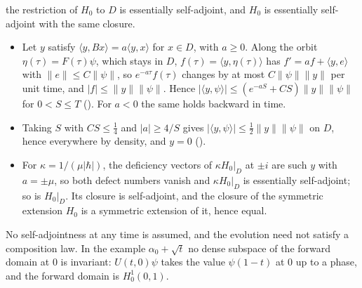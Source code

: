 \documentclass[11pt]{article}
\begin{document}
the restriction of $H_0$ to $D$ is essentially self-adjoint, and $H_0$ is essentially
self-adjoint with the same closure.
\begin{itemize}
\item Let $y$ satisfy $\langle y, B x\rangle = a\langle y, x\rangle$ for $x \in D$, with $a \ge 0$.
  Along the orbit $\eta(\tau) = F(\tau)\psi$, which stays in $D$, $f(\tau) = \langle y, \eta(\tau)\rangle$
  has $f' = af + \langle y, e\rangle$ with $\|e\| \le C\|\psi\|$, so $e^{-a\tau}f(\tau)$ changes by at
  most $C\|\psi\|\|y\|$ per unit time, and $|f| \le \|y\|\|\psi\|$. Hence
  $|\langle y, \psi\rangle| \le (e^{-aS} + CS)\|y\|\|\psi\|$ for $0 < S \le T$
  (). For $a < 0$ the same holds backward in time.
\item Taking $S$ with $CS \le \tfrac14$ and $|a| \ge 4/S$ gives
  $|\langle y,\psi\rangle| \le \tfrac12\|y\|\|\psi\|$ on $D$, hence everywhere by density, and
  $y = 0$ ().
\item For $\kappa = 1/(\mu|\hbar|)$, the deficiency vectors of $\kappa H_0|_D$ at $\pm i$ are such
  $y$ with $a = \pm\mu$, so both defect numbers vanish and $\kappa H_0|_D$ is essentially
  self-adjoint; so is $H_0|_D$. Its closure is self-adjoint, and the closure of the symmetric
  extension $H_0$ is a symmetric extension of it, hence equal.
\end{itemize}
No self-adjointness at any time is assumed, and the evolution need not satisfy a composition
law. In the example $\alpha_0 + \sqrt t$ no dense subspace of the forward domain at $0$ is
invariant: $U(t,0)\psi$ takes the value $\psi(1-t)$ at $0$ up to a phase, and the forward domain
is $H^1_0(0,1)$.
\end{document}
